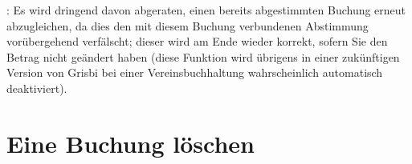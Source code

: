 \Attention{}: Es wird dringend davon abgeraten, einen bereits abgestimmten Buchung erneut abzugleichen, da dies den mit diesem Buchung verbundenen Abstimmung vorübergehend verfälscht; dieser wird am Ende wieder korrekt, sofern Sie den Betrag nicht geändert haben (diese Funktion wird übrigens in einer zukünftigen Version von Grisbi bei einer Vereinsbuchhaltung wahrscheinlich automatisch deaktiviert).


\section{Eine Buchung löschen\label{transactions-delete}}

